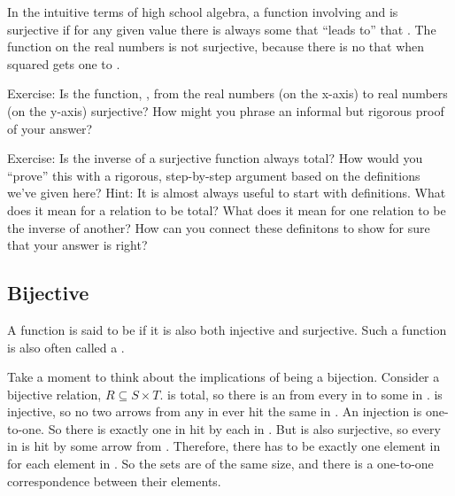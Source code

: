 \documentclass[letterpaper,10pt,english]{sphinxmanual}
\begin{document}
In the intuitive terms of high school algebra, a function involving
 and  is surjective if for any given  value there is always
some  that “leads to” that . The  function on the real
numbers is not surjective, because there is no  that when squared
gets one to .

Exercise: Is the function, , from the real numbers (on
the x-axis) to real numbers (on the y-axis) surjective? How might you
phrase an informal but rigorous proof of your answer?

Exercise: Is the inverse of a surjective function always total? How
would you “prove” this with a rigorous, step-by-step argument based on
the definitions we’ve given here? Hint: It is almost always useful to
start with definitions. What does it mean for a relation to be total?
What does it mean for one relation to be the inverse of another? How
can you connect these definitons to show for sure that your answer is
right?


\subsection{Bijective}
\label{\detokenize{08-relations:bijective}}
A function is said to be  if it is also both injective and
surjective. Such a function is also often called a .

Take a moment to think about the implications of being a bijection.
Consider a bijective relation, \(R \subseteq S \times T.\)  is
total, so there is an  from every  in  to some  in
.   is injective, so no two arrows from any  in  ever hit
the same  in . An injection is one-to-one. So there is exactly
one  in  hit by each  in . But  is also surjective, so
every  in  is hit by some arrow from . Therefore, there has
to be exactly one element in  for each element in . So the sets
are of the same size, and there is a one-to-one correspondence between
their elements.
\end{document}
